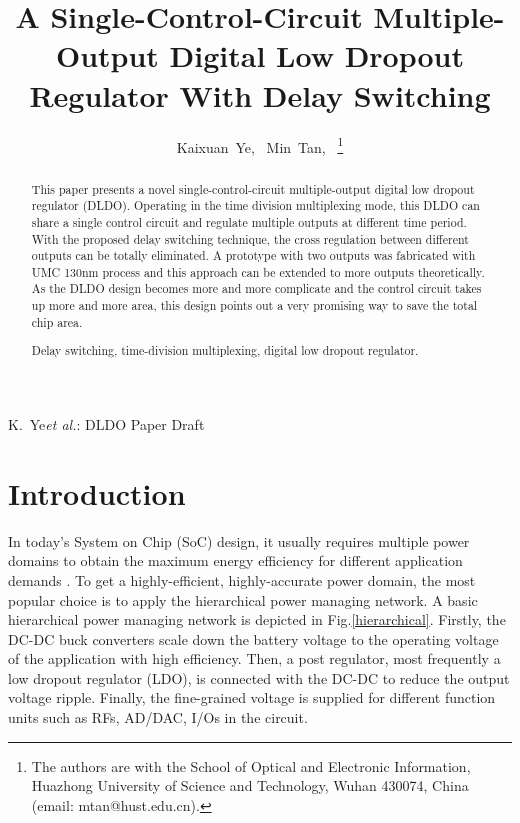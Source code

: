 \documentclass[journal]{IEEEtran}
\begin{document}
\title{A Single-Control-Circuit Multiple-Output Digital Low Dropout Regulator With Delay Switching}
\author{
        Kaixuan~Ye,~
        Min~Tan,~%
\thanks{The authors are with the School of Optical and Electronic Information,
Huazhong University of Science and Technology, Wuhan 430074, China (email:
mtan@hust.edu.cn).}
        }

%
{K.~Ye\MakeLowercase{\textit{et al.}}: DLDO Paper Draft}


\maketitle

\begin{abstract}
This paper presents a novel single-control-circuit multiple-output digital low dropout regulator (DLDO). Operating in the time division multiplexing mode, this DLDO can share a single control circuit and regulate multiple outputs at different time period. With the proposed delay switching technique, the cross regulation between different outputs can be totally eliminated. A prototype with two outputs was fabricated with UMC 130nm process and this approach can be extended to more outputs theoretically. As the DLDO design becomes more and more complicate and the control circuit takes up more and more area, this design points out a very promising way to save the total chip area.\\

\begin{IEEEkeywords}
Delay switching, time-division multiplexing, digital low dropout regulator.
\end{IEEEkeywords}
\end{abstract}

\section{Introduction}
In today's System on Chip (SoC) design, it usually requires multiple power domains to obtain the maximum energy efficiency for different application demands \cite{original,AALDO,AALDO1,coarse-fine,pipeline,asynchrounous,recursive,AP}. To get a highly-efficient, highly-accurate power domain, the most popular choice is to apply the hierarchical power managing network. A basic hierarchical power managing network is depicted in Fig.\ref{hierarchical}. Firstly, the DC-DC buck converters scale down the battery voltage to the operating voltage of the application with high efficiency. Then, a post regulator, most frequently a low dropout regulator (LDO), is connected with the DC-DC to reduce the output voltage ripple. Finally, the fine-grained voltage is supplied for different function units such as RFs, AD/DAC, I/Os in the circuit.
\end{document}
